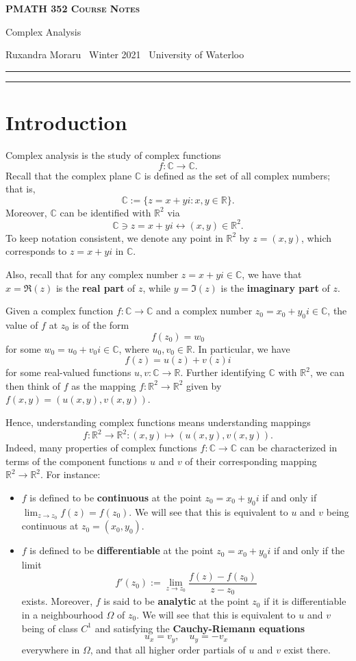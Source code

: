 \documentclass[10pt]{article}
\newcommand{\R}{\mathbb{R}}
\newcommand{\C}{\mathbb{C}}
\newcommand{\newtitle}[4]{
  \begin{center}
	\huge{\textbf{\textsc{#1 Course Notes}}}
    
	\large{\sc #2}
    
	{\sc #3 \textbullet\, #4 \textbullet\, University of Waterloo}
	\normalsize\vspace{1cm}\hrule
  \end{center}
}
\theoremstyle{newstyle}
\begin{document}
\pagestyle{fancy}
\newtitle{PMATH 352}{Complex Analysis}{Ruxandra Moraru}{Winter 2021}

\tableofcontents
\vspace{1cm}\hrule
\fancyhead[R]{\nouppercase\rightmark}
\newpage 
{}

\section{Introduction}
Complex analysis is the study of complex functions 
\[ f : \C \to \C. \]
Recall that the complex plane $\C$ is defined as the set of all complex numbers; that is, 
\[ \C := \{z = x+yi : x, y \in \R\}. \]
Moreover, $\C$ can be identified with $\R^2$ via 
\[ \C \ni z = x+yi \leftrightarrow (x, y) \in \R^2. \]
To keep notation consistent, we denote any point in $\R^2$ by $z = (x, y)$, which corresponds to 
$z = x+yi$ in $\C$.

Also, recall that for any complex number $z = x+yi \in \C$, we have that 
$x = \Re(z)$ is the {\bf real part} of $z$, while $y = \Im(z)$ is the {\bf imaginary part} of $z$.

Given a complex function $f : \C \to \C$ and a complex number $z_0 = x_0 + y_0i \in \C$, 
the value of $f$ at $z_0$ is of the form 
\[ f(z_0) = w_0 \] 
for some $w_0 = u_0 + v_0i \in \C$, where $u_0, v_0 \in \R$. In particular, we have 
\[ f(z) = u(z) + v(z)i \]
for some real-valued functions $u, v : \C \to \R$. Further identifying $\C$ with $\R^2$, 
we can then think of $f$ as the mapping $f : \R^2 \to \R^2$ given by 
$f(x, y) = (u(x, y), v(x, y))$.

Hence, understanding complex functions means understanding mappings 
\[ f : \R^2 \to \R^2 : (x, y) \mapsto (u(x, y), v(x, y)). \]
Indeed, many properties of complex functions $f : \C \to \C$ can be characterized in terms 
of the component functions $u$ and $v$ of their corresponding mapping $\R^2 \to \R^2$. 
For instance:
\begin{itemize}
    \item $f$ is defined to be {\bf continuous} at the point $z_0 = x_0 + y_0i$ if and only if 
    $\lim_{z\to z_0} f(z) = f(z_0)$. We will see that this is equivalent to $u$ and $v$ 
    being continuous at $z_0 = (x_0, y_0)$. 
    \item $f$ is defined to be {\bf differentiable} at the point $z_0 = x_0 + y_0i$ if and only if 
    the limit 
    \[ f'(z_0) := \lim_{z\to z_0} \frac{f(z) - f(z_0)}{z-z_0} \] 
    exists. Moreover, $f$ is said to be {\bf analytic} at the point $z_0$ if it is differentiable 
    in a neighbourhood $\Omega$ of $z_0$. We will see that this is equivalent to $u$ and $v$ 
    being of class $C^1$ and satisfying the {\bf Cauchy-Riemann equations} 
    \[ u_x = v_y, \quad u_y = -v_x \]
    everywhere in $\Omega$, and that all higher order partials of $u$ and $v$ exist there.
\end{itemize}
\end{document}
